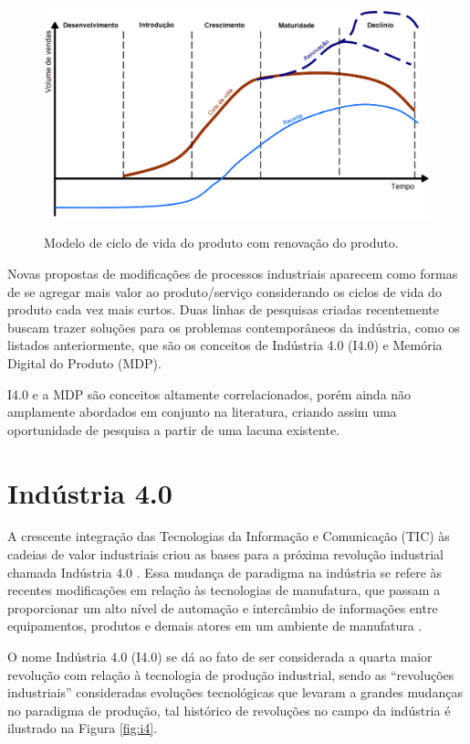 \documentclass[
	12pt,				%
	oneside,			%
	a4paper,			%
	english,			%
	brazil				%
]{abntex2}
\begin{document}
	\begin{figure}[H]
		\centering
		\caption{Modelo de ciclo de vida do produto com renovação do produto.}
		\includegraphics[width=1\textwidth]{life-cycle-extension.png}
		\label{fig:life-cycle-extension}
	\end{figure}
	
	Novas propostas de modificações de processos industriais aparecem como formas de se agregar mais valor ao produto/serviço considerando os ciclos de vida do produto cada vez mais curtos. Duas linhas de pesquisas criadas recentemente buscam trazer soluções para os problemas contemporâneos da indústria, como os listados anteriormente, que são os conceitos de Indústria 4.0 (I4.0) e Memória Digital do Produto (MDP).
	
	I4.0 e a MDP são conceitos altamente correlacionados, porém ainda não amplamente abordados em conjunto na literatura, criando assim uma oportunidade de pesquisa a partir de uma lacuna existente.
	
	
\section{Indústria 4.0}

	A crescente integração das Tecnologias da Informação e Comunicação (TIC) às cadeias de valor industriais criou as bases para a próxima revolução industrial chamada Indústria 4.0 \cite{hermann2016design}. Essa mudança de paradigma na indústria se refere às recentes modificações em relação às tecnologias de manufatura, que passam a proporcionar um alto nível de automação e intercâmbio de informações entre equipamentos, produtos e demais atores em um ambiente de manufatura \cite{lasi2014industryfour}. 
	
	O nome Indústria 4.0 (I4.0) se dá ao fato de ser considerada a quarta maior revolução com relação à tecnologia de produção industrial, sendo as ``revoluções industriais'' consideradas evoluções tecnológicas que levaram a grandes mudanças no paradigma de produção, tal histórico de revoluções no campo da indústria é ilustrado na Figura \ref{fig:i4}.
\end{document}
